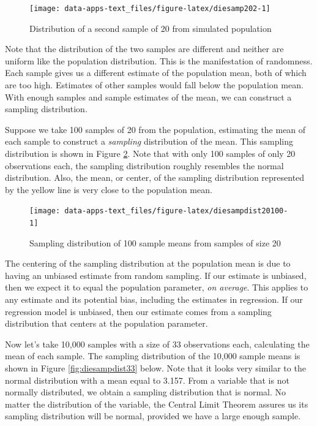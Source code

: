 \documentclass[
]{book}
\begin{document}
\begin{figure}

{\centering \texttt{[image: data-apps-text\_files/figure-latex/diesamp202-1]} 

}

\caption{Distribution of a second sample of 20 from simulated population}\label{fig:diesamp202}
\end{figure}

Note that the distribution of the two samples are different and neither are uniform like the population distribution. This is the manifestation of randomness. Each sample gives us a different estimate of the population mean, both of which are too high. Estimates of other samples would fall below the population mean. With enough samples and sample estimates of the mean, we can construct a sampling distribution.

Suppose we take 100 samples of 20 from the population, estimating the mean of each sample to construct a \emph{sampling} distribution of the mean. This sampling distribution is shown in Figure \ref{fig:diesampdist20100}. Note that with only 100 samples of only 20 observations each, the sampling distribution roughly resembles the normal distribution. Also, the mean, or center, of the sampling distribution represented by the yellow line is very close to the population mean.

\begin{figure}

{\centering \texttt{[image: data-apps-text\_files/figure-latex/diesampdist20100-1]} 

}

\caption{Sampling distribution of 100 sample means from samples of size 20}\label{fig:diesampdist20100}
\end{figure}

The centering of the sampling distribution at the population mean is due to having an unbiased estimate from random sampling. If our estimate is unbiased, then we expect it to equal the population parameter, \emph{on average}. This applies to any estimate and its potential bias, including the estimates in regression. If our regression model is unbiased, then our estimate comes from a sampling distribution that centers at the population parameter.

Now let's take 10,000 samples with a size of 33 observations each, calculating the mean of each sample. The sampling distribution of the 10,000 sample means is shown in Figure \ref{fig:diesampdist33} below. Note that it looks very similar to the normal distribution with a mean equal to 3.157. From a variable that is not normally distributed, we obtain a sampling distribution that is normal. No matter the distribution of the variable, the Central Limit Theorem assures us its sampling distribution will be normal, provided we have a large enough sample.
\end{document}
